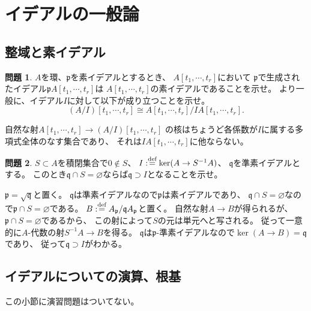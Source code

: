 \documentclass[uplatex]{jsarticle}
\makeatletter
\theoremstyle{definition}
\newtheorem{prob}[prob]{問題}
\renewenvironment{proof}[1][\proofname]{
  \pushQED{\qed}%
  \normalfont \topsep6\p@\@plus6\p@\relax
  \trivlist
  \item[\hskip\labelsep
    #1\@addpunct{\textbf{.}}]\ignorespaces
}{%
  \popQED\endtrivlist\@endpefalse
}
\providecommand{\proofname}{証明}
\newcommand\mfp{\mathfrak{p}}
\newcommand\mfq{\mathfrak{q}}
\renewcommand{\emptyset}{\varnothing}
\def\dfn{:\overset{\mbox{{\scriptsize def}}}{=}}
\makeatother
\begin{document}
\section{イデアルの一般論}
\label{section: 2}

\subsection{整域と素イデアル}


\begin{prob}\label{prob: 2.0.1}
  \(A\)を環、\(\mfp\)を素イデアルとするとき、
  \(A[t_1,\cdots,t_r]\)において
  \(\mfp\)で生成されたイデアル\(\mfp A[t_1,\cdots, t_r]\)は
  \(A[t_1,\cdots, t_r]\)の素イデアルであることを示せ。
  より一般に、イデアル\(I\)に対して以下が成り立つことを示せ。
  \[(A/I)[t_1,\cdots, t_r]\cong A[t_1,\cdots, t_r]/IA[t_1,\cdots ,t_r].\]
\end{prob}

\begin{proof}
  自然な射\(A[t_1,\cdots, t_r] \to (A/I)[t_1,\cdots, t_r]\)
  の核はちょうど各係数が\(I\)に属する多項式全体のなす集合であり、
  それは\(IA[t_1,\cdots, t_r]\)に他ならない。
\end{proof}


\begin{prob}\label{prob: 2.0.2}
  \(S\subset A\)を積閉集合で\(0\not\in S\)、
  \(I\dfn \ker(A\to S^{-1}A)\)、
  \(\mfq\)を準素イデアルとする。
  このとき\(\mfq\cap S = \emptyset\)ならば\(\mfq\supset I\)となることを示せ。
\end{prob}

\begin{proof}
  \(\mfp = \sqrt{\mfq}\)と置く。
  \(\mfq\)は準素イデアルなので\(\mfp\)は素イデアルであり、
  \(\mfq\cap S = \emptyset\)なので\(\mfp\cap S = \emptyset\)である。
  \(B\dfn A_{\mfp}/\mfq A_\mfp\)と置く。
  自然な射\(A\to B\)が得られるが、
  \(\mfp\cap S = \emptyset\)であるから、
  この射によって\(S\)の元は単元へと写される。
  従って一意的に\(A\)-代数の射\(S^{-1}A \to B\)を得る。
  \(\mfq\)は\(\mfp\)-準素イデアルなので\(\ker(A\to B) = \mfq\)であり、
  従って\(\mfq\supset I\)がわかる。
\end{proof}



\subsection{イデアルについての演算、根基}

この小節に演習問題はついてない。
\end{document}
